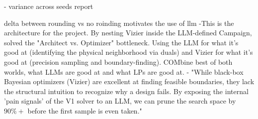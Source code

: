 - variance across seeds report 

delta between rounding vs no roinding motivates the use of llm
-This is the architecture for the project. By nesting Vizier inside the LLM-defined Campaign, solved the "Architect vs. Optimizer" bottleneck. Using the LLM for what it’s good at (identifying the physical neighborhood via duals) and Vizier for what it’s good at (precision sampling and boundary-finding). COMbine best of both worlds, what LLMs are good at and what LPs are good at. 
- "While black-box Bayesian optimizers (Vizier) are excellent at finding feasible boundaries, they lack the structural intuition to recognize why a design fails. By exposing the internal 'pain signals' of the V1 solver to an LLM, we can prune the search space by $90\%+$ before the first sample is even taken."